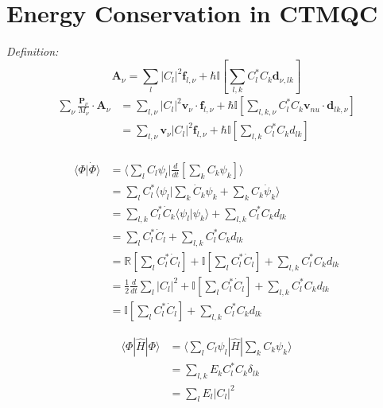 \chapter{Energy Conservation in CTMQC}
\label{ap:EnerConsDerivation}
\noindent \textit{Definition:}
\[\mathbf{A}_{\nu} = \sum_{l} |C_{l}|^2 \mathbf{f}_{l, \nu}  + \hbar \mathbb{I}\left[ \sum_{l, k} C_{l}^{*}C_{k} \mathbf{d}_{\nu, lk} \right]\]
\begin{align*}
	\sum_{\nu} \frac{\mathbf{P}_{\nu}}{M_{\nu}} \cdot \mathbf{A}_{\nu} &= \sum_{l, \nu}  |C_{l}|^2 \mathbf{v}_{\nu} \cdot \mathbf{f}_{l, \nu} + \hbar \mathbb{I} \left[ \sum_{l,k, \nu} C_{l}^{*} C_{k} \mathbf{v}_{nu} \cdot \mathbf{d}_{lk, \nu} \right] \\
	&= \sum_{l, \nu} \mathbf{v}_{\nu} |C_{l}|^2 \mathbf{f}_{l, \nu} + \hbar \mathbb{I} \left[ \sum_{l,k} C_{l}^{*} C_{k} d_{lk} \right] \\
\end{align*}


\begin{align*}
	\langle \Phi | \dot{\Phi} \rangle &= \langle \sum_{l} C_{l} \psi_{l} | \frac{d}{dt}\left[ \sum_{k} C_{k} \psi_{k} \right] \rangle \\
	&= \sum_{l} C_{l}^{*} \langle \psi_{l} | \sum_{k} \dot{C}_{k} \psi_{k} + \sum_{k} C_{k} \dot{\psi}_{k} \rangle	\\
	&= \sum_{l, k} C_{l}^{*}\dot{C}_{k} \langle \psi_{l} | \psi_{k} \rangle + \sum_{l, k} C_{l}^{*}C_{k} d_{lk}	\\
	&= \sum_{l} C_{l}^{*} \dot{C}_{l} + \sum_{l, k} C_{l}^{*}C_{k} d_{lk} \\
	&= \mathbb{R}\left[ \sum_{l} C_{l}^{*} \dot{C}_{l} \right] + \mathbb{I}\left[ \sum_{l} C_{l}^{*} \dot{C}_{l} \right] + \sum_{l, k} C_{l}^{*}C_{k} d_{lk} \\
	&= \frac{1}{2} \frac{d}{dt} \sum_{l} |C_{l}|^2 + \mathbb{I}\left[ \sum_{l} C_{l}^{*} \dot{C}_{l} \right] + \sum_{l, k} C_{l}^{*}C_{k} d_{lk} \\
	&= \mathbb{I}\left[ \sum_{l} C_{l}^{*} \dot{C}_{l} \right] + \sum_{l, k} C_{l}^{*}C_{k} d_{lk}
\end{align*}

\begin{align*}
	\langle \Phi | \hat{H} | \Phi \rangle &= \langle \sum_{l} C_{l} \psi_{l} | \hat{H} | \sum_{k} C_{k} \psi_{k} \rangle \\
	&= \sum_{l, k} E_{k} C_{l}^{*} C_{k} \delta_{lk} \\
	&= \sum_{l} E_{l} |C_{l}|^2
\end{align*}


